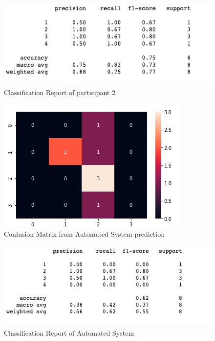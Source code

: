 \begin{figure}[!htp]
    \includegraphics[width=\textwidth]{Images/p2r.png}
    \caption{Classification Report of participant 2}
    \label{fig:f11}
\end{figure}

\pagebreak

\begin{figure}[!htp]
    \includegraphics[width=\textwidth]{Images/a2.png}
    \caption{Confusion Matrix from Automated System prediction}
    \label{fig:f11}
\end{figure}

\begin{figure}[!htp]
    \includegraphics[width=\textwidth]{Images/a2r.png}
    \caption{Classification Report of Automated System}
    \label{fig:f11}
\end{figure}


